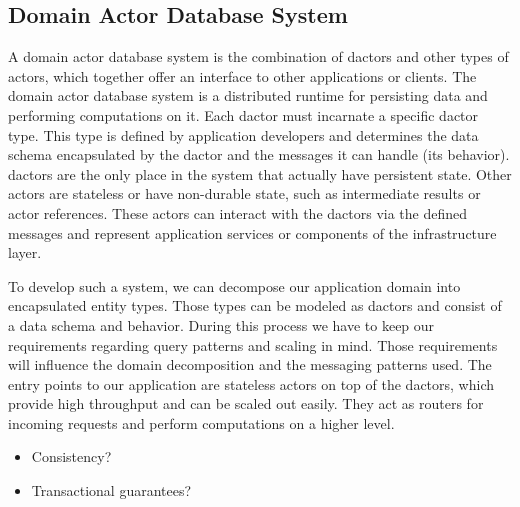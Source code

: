 

  \subsection{Domain Actor Database System}\label{sec:domain_actor_database}
    A domain actor database system is the combination of \glspl{dactor} and other types of actors, which together offer an interface to other applications or clients.
    The domain actor database system is a distributed runtime for persisting data and performing computations on it.
    Each \gls{dactor} must incarnate a specific \gls{dactor} type.
    This type is defined by application developers and determines the data schema encapsulated by the \gls{dactor} and the messages it can handle (its behavior).
    \glspl{dactor} are the only place in the system that actually have persistent state.
    Other actors are stateless or have non-durable state, such as intermediate results or actor references.
    These actors can interact with the \glspl{dactor} via the defined messages and represent application services or components of the infrastructure layer.
    
    To develop such a system, we can decompose our application domain into encapsulated entity types.
    Those types can be modeled as \glspl{dactor} and consist of a data schema and behavior.
    During this process we have to keep our requirements regarding query patterns and scaling in mind.
    Those requirements will influence the domain decomposition and the messaging patterns used.
    The entry points to our application are stateless actors on top of the \glspl{dactor}, which provide high throughput and can be scaled out easily.
    They act as routers for incoming requests and perform computations on a higher level.

    \begin{itemize}
      \item Consistency?
      \item Transactional guarantees?
    \end{itemize}




